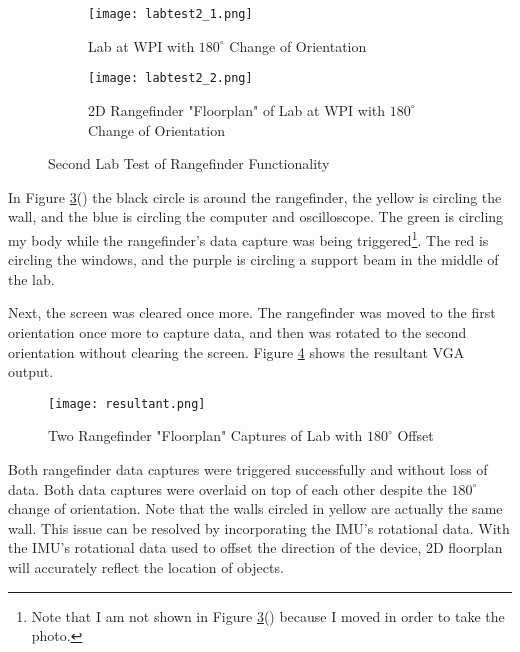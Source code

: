 \begin{figure}[H] 
	\begin{subfigure}{1\textwidth}
	\centering
		\texttt{[image: labtest2\_1.png]}
		\caption{Lab at WPI with $180^\circ$ Change of Orientation}
		\label{lab2}
	\end{subfigure}
	\begin{subfigure}{1\textwidth}
	\centering
		\texttt{[image: labtest2\_2.png]}
		\caption{2D Rangefinder "Floorplan" of Lab at WPI with $180^\circ$ Change of Orientation}
		\label{floorplan2}
	\end{subfigure}
	\caption{Second Lab Test of Rangefinder Functionality}
	\label{labtest2}
\end{figure}

In Figure \ref{labtest2}() the black circle is around the rangefinder, the yellow is circling the wall, and the blue is circling the computer and oscilloscope. The green is circling my body while the rangefinder's data capture was being triggered\footnote{Note that I am not shown in Figure \ref{labtest2}() because I moved in order to take the photo.}. The red is circling the windows, and the purple is circling a support beam in the middle of the lab.
\par
Next, the screen was cleared once more. The rangefinder was moved to the first orientation once more to capture data, and then was rotated to the second orientation without clearing the screen. Figure \ref{resultant} shows the resultant VGA output.

\begin{figure}[H]
	\centerline{\texttt{[image: resultant.png]}}
	\caption{Two Rangefinder "Floorplan" Captures of Lab with $180^\circ$ Offset}
	\label{resultant}
\end{figure}

Both rangefinder data captures were triggered successfully and without loss of data. Both data captures were overlaid on top of each other despite the $180^\circ$ change of orientation. Note that the walls circled in yellow are actually the same wall. This issue can be resolved by incorporating the IMU's rotational data. With the IMU's rotational data used to offset the direction of the device, 2D floorplan will accurately reflect the location of objects.




